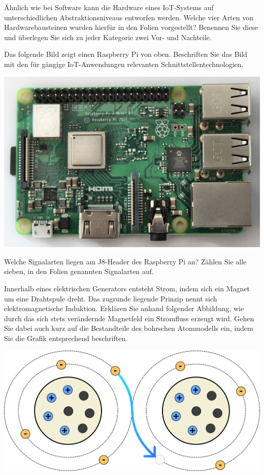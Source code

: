 \AufgabenHeader

\teilaufgabe
Ähnlich wie bei Software kann die Hardware eines IoT-Systems auf unterschiedlichen
Abstraktionsniveaus entworfen werden. Welche vier Arten von Hardwarebausteinen
wurden hierfür in den Folien vorgestellt? Benennen Sie diese und überlegen Sie
sich zu jeder Kategorie zwei Vor- und Nachteile.

\bigskip
\teilaufgabe
Das folgende Bild zeigt einen Raspberry Pi von oben. Beschriften Sie das Bild mit
den für gängige IoT-Anwendungen relevanten Schnittstellentechnologien.

\begin{center}
    \includegraphics[width=.5\textwidth]{2-hardwaredesign/img/rasbperrypi_foto}
\end{center}

\bigskip
\teilaufgabe
Welche Signalarten liegen am J8-Header des Raspberry Pi an? Zählen Sie alle sieben,
in den Folien genannten Signalarten auf.

\teilaufgabe
Innerhalb eines elektrischen Generators entsteht Strom, indem sich ein Magnet um
eine Drahtspule dreht. Das zugrunde liegende Prinzip nennt sich elektromagnetische
Induktion. Erklären Sie anhand folgender Abbildung, wie durch das sich stets
verändernde Magnetfeld ein Stromfluss erzeugt wird. Gehen Sie dabei auch kurz
auf die Bestandteile des bohrschen Atommodells ein, indem Sie die Grafik
entsprechend beschriften.

\begin{center}
    \includegraphics[width=.75\textwidth]{2-hardwaredesign/img/atom_elektronenfluss}
\end{center}

